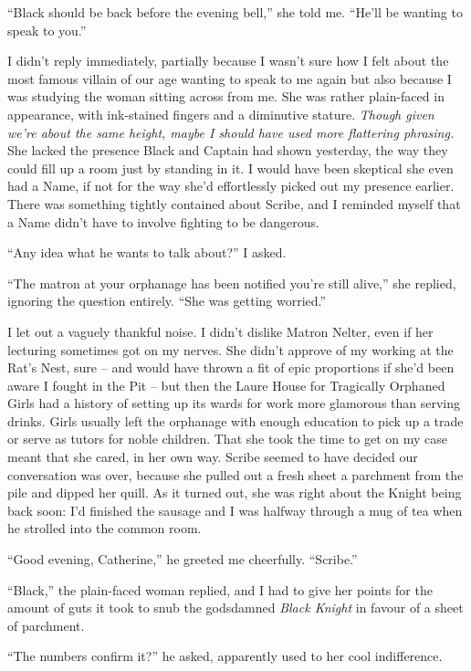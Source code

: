 \documentclass[12pt, openany]{book}
\begin{document}
“Black should be back before the evening bell,” she told me. “He’ll be wanting to speak to you.”

I didn’t reply immediately, partially because I wasn’t sure how I felt about the most famous villain of our age wanting to speak to me again but also because I was studying the woman sitting across from me. She was rather plain-faced in appearance, with ink-stained fingers and a diminutive stature. \textit{Though given we’re about the same height, maybe I should have used more flattering phrasing.} She lacked the presence Black and Captain had shown yesterday, the way they could fill up a room just by standing in it. I would have been skeptical she even had a Name, if not for the way she’d effortlessly picked out my presence earlier. There was something tightly contained about Scribe, and I reminded myself that a Name didn’t have to involve fighting to be dangerous.

“Any idea what he wants to talk about?” I asked.

“The matron at your orphanage has been notified you’re still alive,” she replied, ignoring the question entirely. “She was getting worried.”

I let out a vaguely thankful noise. I didn’t dislike Matron Nelter, even if her lecturing sometimes got on my nerves. She didn’t approve of my working at the Rat’s Nest, sure – and would have thrown a fit of epic proportions if she’d been aware I fought in the Pit – but then the Laure House for Tragically Orphaned Girls had a history of setting up its wards for work more glamorous than serving drinks. Girls usually left the orphanage with enough education to pick up a trade or serve as tutors for noble children. That she took the time to get on my case meant that she cared, in her own way. Scribe seemed to have decided our conversation was over, because she pulled out a fresh sheet a parchment from the pile and dipped her quill. As it turned out, she was right about the Knight being back soon: I’d finished the sausage and I was halfway through a mug of tea when he strolled into the common room.

“Good evening, Catherine,” he greeted me cheerfully. “Scribe.”

“Black,” the plain-faced woman replied, and I had to give her points for the amount of guts it took to snub the godsdamned \textit{Black Knight} in favour of a sheet of parchment.

“The numbers confirm it?” he asked, apparently used to her cool indifference.
\end{document}
